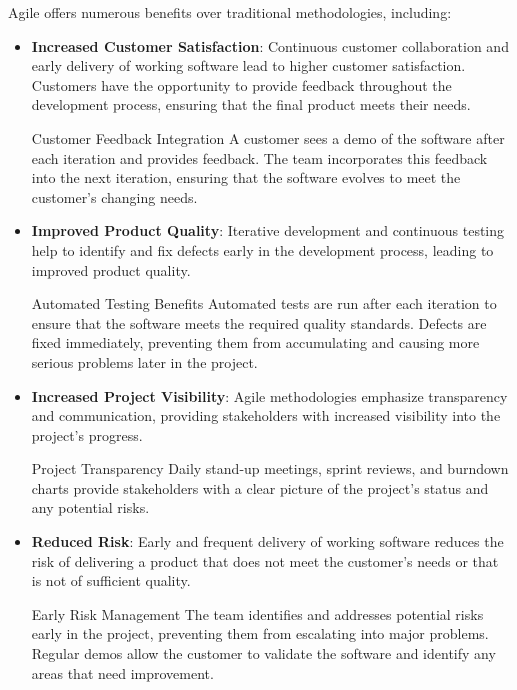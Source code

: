 Agile offers numerous benefits over traditional methodologies, including:

\begin{itemize}
  \item \textbf{Increased Customer Satisfaction}: Continuous customer collaboration and early delivery of working software lead to higher customer satisfaction. Customers have the opportunity to provide feedback throughout the development process, ensuring that the final product meets their needs.
        \begin{examplecard}{Customer Feedback Integration}
          A customer sees a demo of the software after each iteration and provides feedback. The team incorporates this feedback into the next iteration, ensuring that the software evolves to meet the customer's changing needs.
        \end{examplecard}

  \item \textbf{Improved Product Quality}: Iterative development and continuous testing help to identify and fix defects early in the development process, leading to improved product quality.

        \begin{examplecard}{Automated Testing Benefits}
          Automated tests are run after each iteration to ensure that the software meets the required quality standards. Defects are fixed immediately, preventing them from accumulating and causing more serious problems later in the project.
        \end{examplecard}

  \item \textbf{Increased Project Visibility}: Agile methodologies emphasize transparency and communication, providing stakeholders with increased visibility into the project's progress.

        \begin{examplecard}{Project Transparency}
          Daily stand-up meetings, sprint reviews, and burndown charts provide stakeholders with a clear picture of the project's status and any potential risks.
        \end{examplecard}

  \item \textbf{Reduced Risk}: Early and frequent delivery of working software reduces the risk of delivering a product that does not meet the customer's needs or that is not of sufficient quality.

        \begin{examplecard}{Early Risk Management}
          The team identifies and addresses potential risks early in the project, preventing them from escalating into major problems. Regular demos allow the customer to validate the software and identify any areas that need improvement.
        \end{examplecard}


\end{itemize}
